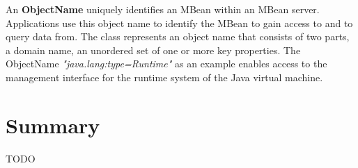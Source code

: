 An \textbf{ObjectName} uniquely identifies an MBean within an MBean server. Applications use this object name to identify
the MBean to gain access to and to query data from. The class represents an object name that consists of two parts,
a domain name, an unordered set of one or more key properties. The ObjectName \textit{"java.lang:type=Runtime"}
as an example enables access to the management interface for the runtime system of the Java virtual machine.

\section{Summary}

TODO